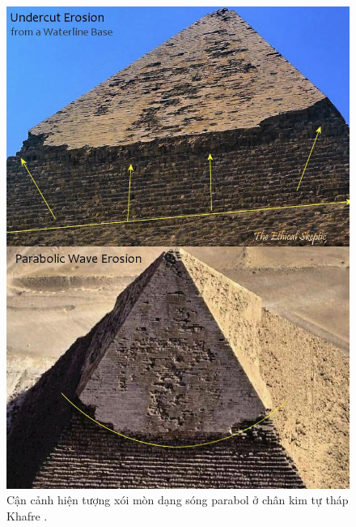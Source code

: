 \documentclass[10pt,twocolumn,letterpaper]{article}
\begin{document}
\begin{figure}[H]
\begin{center}
   \includegraphics[width=1\linewidth]{wave.jpg}
\end{center}
   \caption{Cận cảnh hiện tượng xói mòn dạng sóng parabol ở chân kim tự tháp Khafre \cite{27}.}
\label{fig:19}
\label{fig:onecol}
\end{figure}
\end{document}
